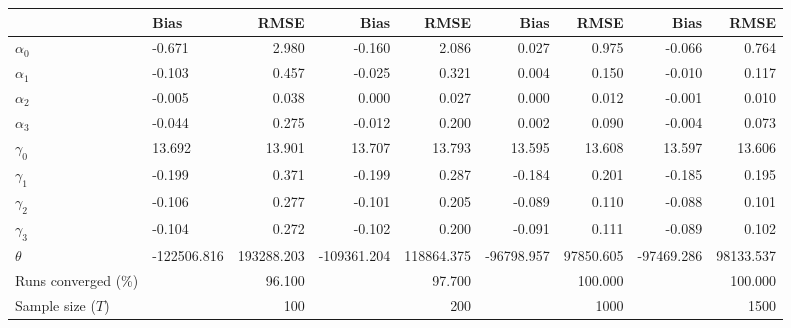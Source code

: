 
\begin{tabular}[t]{llrrrrrrr}
\toprule
  & Bias & RMSE & Bias & RMSE & Bias & RMSE & Bias & RMSE\\
\midrule
$\alpha_{0}$ & -0.671 & 2.980 & -0.160 & 2.086 & 0.027 & 0.975 & -0.066 & 0.764\\
$\alpha_{1}$ & -0.103 & 0.457 & -0.025 & 0.321 & 0.004 & 0.150 & -0.010 & 0.117\\
$\alpha_{2}$ & -0.005 & 0.038 & 0.000 & 0.027 & 0.000 & 0.012 & -0.001 & 0.010\\
$\alpha_{3}$ & -0.044 & 0.275 & -0.012 & 0.200 & 0.002 & 0.090 & -0.004 & 0.073\\
$\gamma_{0}$ & 13.692 & 13.901 & 13.707 & 13.793 & 13.595 & 13.608 & 13.597 & 13.606\\
$\gamma_{1}$ & -0.199 & 0.371 & -0.199 & 0.287 & -0.184 & 0.201 & -0.185 & 0.195\\
$\gamma_{2}$ & -0.106 & 0.277 & -0.101 & 0.205 & -0.089 & 0.110 & -0.088 & 0.101\\
$\gamma_{3}$ & -0.104 & 0.272 & -0.102 & 0.200 & -0.091 & 0.111 & -0.089 & 0.102\\
$\theta$ & -122506.816 & 193288.203 & -109361.204 & 118864.375 & -96798.957 & 97850.605 & -97469.286 & 98133.537\\
Runs converged (\%) &  & 96.100 &  & 97.700 &  & 100.000 &  & 100.000\\
Sample size ($T$) &  & 100 &  & 200 &  & 1000 &  & 1500\\
\bottomrule
\end{tabular}
